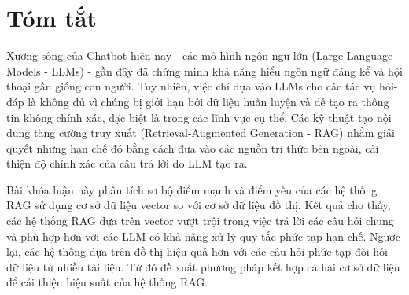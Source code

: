 \chapter*{Tóm tắt}
Xương sông của Chatbot hiện nay - các mô hình ngôn ngữ lớn (Large Language Models - LLMs) - gần đây đã chứng minh khả năng hiểu ngôn ngữ đáng kể và hội thoại gần giống con người. Tuy nhiên, việc chỉ dựa vào LLMs cho các tác vụ hỏi-đáp là không đủ vì chúng bị giới hạn bởi dữ liệu huấn luyện và dễ tạo ra thông tin không chính xác, đặc biệt là trong các lĩnh vực cụ thể. Các kỹ thuật tạo nội dung tăng cường truy xuất (Retrieval-Augmented Generation - RAG) nhằm giải quyết những hạn chế đó bằng cách đưa vào các nguồn tri thức bên ngoài, cải thiện độ chính xác của câu trả lời do LLM tạo ra.

Bài khóa luận này phân tích sơ bộ điểm mạnh và điểm yếu của các hệ thống RAG sử dụng cơ sở dữ liệu vector so với cơ sở dữ liệu đồ thị. Kết quả cho thấy, các hệ thống RAG dựa trên vector vượt trội trong việc trả lời các câu hỏi chung và phù hợp hơn với các LLM có khả năng xử lý quy tắc phức tạp hạn chế. Ngược lại, các hệ thống dựa trên đồ thị hiệu quả hơn với các câu hỏi phức tạp đòi hỏi dữ liệu từ nhiều tài liệu. Từ đó đề xuất phương pháp kết hợp cả hai cơ sở dữ liệu để cải thiện hiệu suất của hệ thống RAG.

